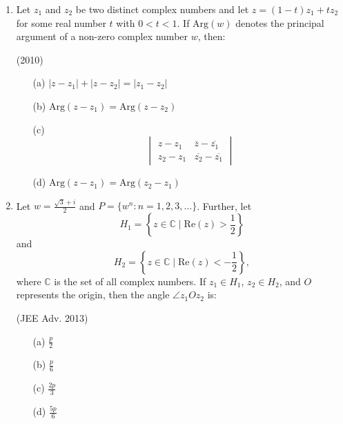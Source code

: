\documentclass[journal,12pt,twocolumn]{IEEEtran}
\theoremstyle{remark}
\begin{document}
\begin{enumerate}
    \begin{itemize}
    \item[(a)] x=3,y=4
    \item[(b)] x=1,y=3
    \item[(c)] x=0,y=4
    \item[(d)] x=0,y=0
    \end{itemize}
    

    \item Let \( z_1 \) and \( z_2 \) be two distinct complex numbers and let \( z = (1 - t) z_1 + t z_2 \) for some real number \( t \) with \( 0 < t < 1 \). If \(\text{Arg}(w)\) denotes the principal argument of a non-zero complex number \( w \), then:

\hfill (2010)

\begin{itemize}
    \item[(a)] \( |z - z_1| + |z - z_2| = |z_1 - z_2| \)
    \item[(b)] \(\text{Arg}(z - z_1) = \text{Arg}(z - z_2)\)
    \item[(c)] \[
    \begin{vmatrix}
    z - z_1 & \overline{z} - \overline{z_1} \\
    z_2 - z_1 & \overline{z_2} - \overline{z_1}
    \end{vmatrix}
    \]
    \item[(d)] \(\text{Arg}(z - z_1) = \text{Arg}(z_2 - z_1)\)
\end{itemize}

   \item Let \( w = \frac{\sqrt{3} + i}{2} \) and \( P = \{w^n : n = 1, 2, 3, \ldots \} \). Further, let 
\[
H_1 = \left\{ z \in \mathbb{C} \mid \text{Re}(z) > \frac{1}{2} \right\}
\]
and
\[
H_2 = \left\{ z \in \mathbb{C} \mid \text{Re}(z) < -\frac{1}{2} \right\},
\]
where \( \mathbb{C} \) is the set of all complex numbers. If \( z_1 \in H_1 \), \( z_2 \in H_2 \), and \( O \) represents the origin, then the angle \( \angle z_1Oz_2 \) is:

\hfill (JEE Adv. 2013)

\begin{multicols}{4}
    \begin{itemize}
    \item[(a)] \(\frac{p}{2}\)
    \item[(b)] \(\frac{p}{6}\)
    \item[(c)] \(\frac{2p}{3}\)
    \item[(d)] \(\frac{5p}{6}\)
    \end{itemize}
\end{multicols}


\end{enumerate}
\end{document}
